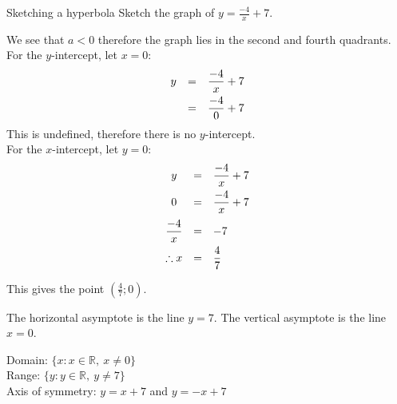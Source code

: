 \begin{wex}
{Sketching a hyperbola}
{Sketch the graph of $y=\frac{-4}{x}+7$.}
{
We see that $a<0$ therefore the graph lies in the second and fourth quadrants.
For the $y$-intercept, let $x=0$:
\begin{equation*}
 \begin{array}{ccc}
 \hfill  y &= & \dfrac{-4}{x}+7 \vspace{4pt}\hfill \\
 \hfill &= & \dfrac {-4}{0} +7  \hfill
 \end{array}
\end{equation*}
This is undefined, therefore there is no $y$-intercept.\vspace{10pt} \\

For the $x$-intercept, let $y=0$:
\begin{equation*}
 \begin{array}{ccl}
 y &=&  \dfrac{-4}{x}+7\vspace{4pt}\\
 0 &=&  \dfrac{-4}{x}+7\vspace{6pt}\\ 
 \dfrac{-4}{x} &=& -7\vspace{4pt} \\
\therefore x &= &\dfrac{4}{7}
 \end{array}
\end{equation*}

This gives the point $\left(\frac{4}{7};0\right)$.


The horizontal asymptote is the line $y=7$. The vertical asymptote is the line $x=0$.

\par
\setcounter{subfigure}{0}
\begin{center}
\end{center}


Domain: $\{x:x \in \mathbb{R},~x\ne 0\}$\\
Range: $\{y:y \in \mathbb{R},~y\ne 7\}$\\
Axis of symmetry: $y=x+7$ and $y=-x+7$
}
\end{wex}

